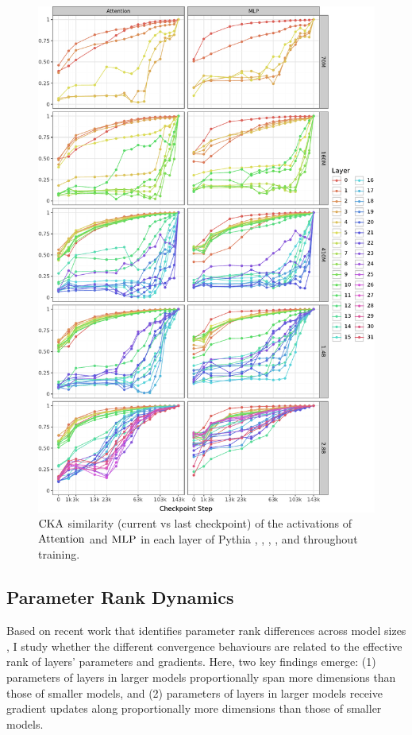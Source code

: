\begin{figure}[h!]
    \centering
    \includegraphics[width=0.9\linewidth]{chapters/tending-towards-stability/figures/cka_full_lines.pdf}
    \vspace{-5pt}
    \caption{$\mathrm{CKA}$ similarity (current vs last checkpoint) of the activations of $\mathrm{Attention}$ and $\mathrm{MLP}$ in each layer of Pythia \sevenmil, \sixmil, \fourmil, \onebil, and \twobil throughout training.}%
    \label{fig:cka-layer-wise-lines}
\end{figure}
\clearpage

\subsection{Parameter Rank Dynamics}
\label{subsec:parameter-rank-dynamics}

Based on recent work that identifies parameter rank differences across model sizes \citep{godey2024small}, I study whether the different convergence behaviours are related to the effective rank of layers' parameters and gradients. Here, two key findings emerge: (1) parameters of layers in larger models proportionally span more dimensions than those of smaller models, and (2) parameters of layers in larger models receive gradient updates along proportionally more dimensions than those of smaller models.


